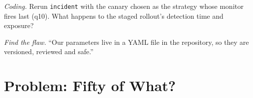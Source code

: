 \begin{exercise}[$\star\star\star$]\label{exo:pl:signal-serving-and-parameter-management:7}
\emph{Coding.} Rerun \texttt{incident} with the canary chosen as the strategy whose monitor fires last (q10). What happens to the staged
rollout's detection time and exposure?
\end{exercise}

\begin{exercise}[$\star\star\star$]\label{exo:pl:signal-serving-and-parameter-management:8}
\emph{Find the flaw.} ``Our parameters live in a YAML file in the repository, so they are versioned, reviewed and safe.''
\end{exercise}

\section{Problem: Fifty of What?}

